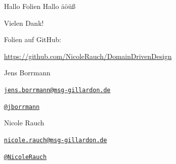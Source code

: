 \begin{frame}{Hallo Folien}
Hallo äöüß
\end{frame}


{
\begin{frame}{Vielen Dank!}

        Folien auf GitHub:
        \vspace{-0.8em}
        \begin{center}
                \url{https://github.com/NicoleRauch/DomainDrivenDesign}
        \end{center}

        \begin{block}{Jens Borrmann}
        \begin{description}[Twitterxx]
                \item[E-Mail]  \href{mailto:jens.borrmann@msg-gillardon.de}{\texttt{jens.borrmann@msg-gillardon.de}}
                \item[Twitter] \href{http://twitter.com/jborrmann}{\texttt{@jborrmann}}
        \end{description}
        \end{block}
        \begin{block}{Nicole Rauch}
        \begin{description}[Twitterxx]
                \item[E-Mail]  \href{mailto:nicole.rauch@msg-gillardon.de}{\texttt{nicole.rauch@msg-gillardon.de}}
                \item[Twitter] \href{http://twitter.com/NicoleRauch}{\texttt{@NicoleRauch}}
        \end{description}
        \end{block}
\end{frame}
}
